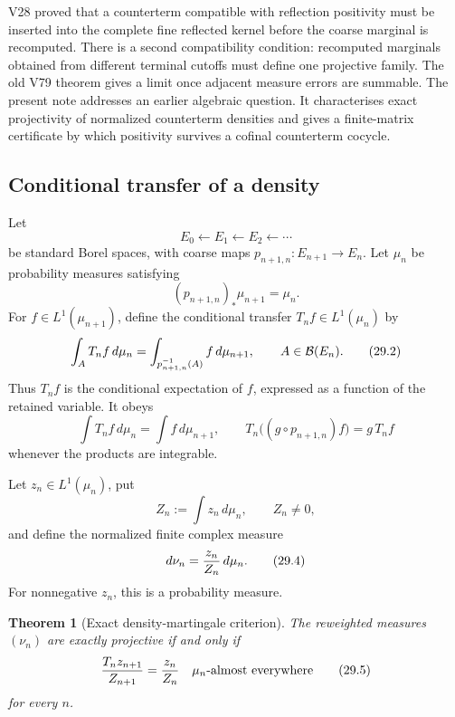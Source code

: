 \documentclass[11pt]{article}
\newtheorem{theorem}{Theorem}[section]
\theoremstyle{remark}
\begin{document}
V28 proved that a counterterm compatible with reflection positivity
must be inserted into the complete fine reflected kernel before the
coarse marginal is recomputed.  There is a second compatibility
condition: recomputed marginals obtained from different terminal
cutoffs must define one projective family.  The old V79 theorem gives
a limit once adjacent measure errors are summable.  The present note
addresses an earlier algebraic question.  It characterises exact
projectivity of normalized counterterm densities and gives a
finite-matrix certificate by which positivity survives a cofinal
counterterm cocycle.

\subsection{Conditional transfer of a density}

Let
\[
 E_0\longleftarrow E_1\longleftarrow E_2\longleftarrow\cdots
\]
be standard Borel spaces, with coarse maps
\(p_{n+1,n}:E_{n+1}\to E_n\).  Let \(\mu_n\) be probability
measures satisfying
\begin{equation}
 (p_{n+1,n})_*\mu_{n+1}=\mu_n.                 \tag{29.1}
\end{equation}
For \(f\in L^1(\mu_{n+1})\), define the conditional transfer
\(T_nf\in L^1(\mu_n)\) by
\begin{equation}
 \int_A T_nf\,d\mu_n
 =
 \int_{p_{n+1,n}^{-1}(A)} f\,d\mu_{n+1},
 \qquad A\in{\cal B}(E_n).                     \tag{29.2}
\end{equation}
Thus \(T_nf\) is the conditional expectation of \(f\), expressed as
a function of the retained variable.  It obeys
\begin{equation}
 \int T_nf\,d\mu_n=\int f\,d\mu_{n+1},
 \qquad
 T_n\bigl((g\circ p_{n+1,n})f\bigr)=g\,T_nf       \tag{29.3}
\end{equation}
whenever the products are integrable.

Let \(z_n\in L^1(\mu_n)\), put
\[
 Z_n:=\int z_n\,d\mu_n,
 \qquad Z_n\ne0,
\]
and define the normalized finite complex measure
\begin{equation}
 d\nu_n={z_n\over Z_n}\,d\mu_n.                 \tag{29.4}
\end{equation}
For nonnegative \(z_n\), this is a probability measure.

\begin{theorem}[Exact density-martingale criterion]
\label{thm:v12v29-density-martingale}
The reweighted measures \((\nu_n)\) are exactly projective if and
only if
\begin{equation}
 {T_nz_{n+1}\over Z_{n+1}}
 =
 {z_n\over Z_n}
 \quad\text{\(\mu_n\)-almost everywhere}         \tag{29.5}
\end{equation}
for every \(n\).
\end{theorem}
\end{document}
